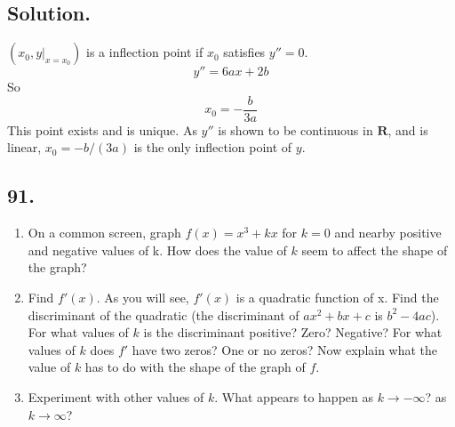 \documentclass{article}
\begin{document}
\subsection*{Solution.}
$(x_0,y|_{x=x_0})$ is a inflection point if $x_0$ satisfies $y''=0$.
\[y''=6ax+2b\]
So
\[x_0=-\frac{b}{3a}\]
This point exists and is unique. As $y''$ is shown to be continuous in $\mathbf{R}$, and is linear, $x_0=-b/(3a)$ is the only inflection point of $y$.
\subsection*{91.}
\begin{enumerate}[label=\textbf{\alph*.}]
    \item On a common screen, graph $f(x)=x^3+kx$ for $k=0$ and nearby positive and negative values of k. How does the value of $k$ seem to affect the shape of the graph?
    \item Find $f'(x)$. As you will see, $f'(x)$ is a quadratic function of x. Find the discriminant of the quadratic (the discriminant of $ax^2+bx+c$ is $b^2-4ac$). For what values of $k$ is the discriminant positive? Zero? Negative? For what values of $k$ does $f'$ have two zeros? One or no zeros? Now explain what the value of $k$ has to do with the shape of the graph of $f$.
    \item Experiment with other values of $k$. What appears to happen as $k\to-\infty$? as $k\to \infty$?
\end{enumerate}
\end{document}
